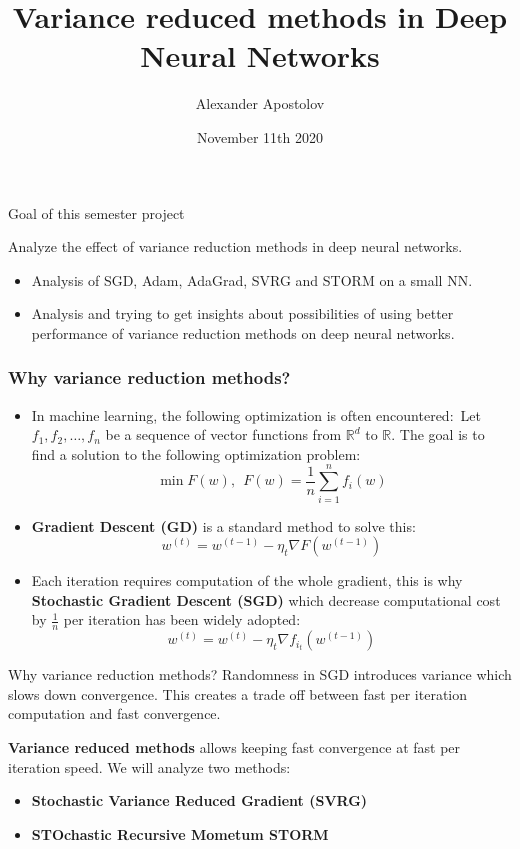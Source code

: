 \documentclass[10pt]{beamer}
\title{Variance reduced methods in Deep Neural Networks}
\author{Alexander Apostolov}
\institute {École Polytechnique Fédérale de Lausanne}
\date{November 11th 2020}
\begin{document}
\frame{\titlepage}


\begin{frame}{Goal of this semester project}

Analyze the effect of \alert{variance reduction methods} in \alert{deep neural networks}.
\newline
\begin{itemize}
    \item Analysis of SGD, Adam, AdaGrad, SVRG and STORM on a small NN.
    \item Analysis and trying to get insights about possibilities of using better performance of variance reduction methods on deep neural networks. 
\end{itemize}
    
\end{frame}

\begin{frame}
\frametitle{Why variance reduction methods?}
\begin{itemize}
    \item In machine learning, the following optimization is often encountered:\
    Let $f_1, f_2, \dots, f_n$ be a sequence of vector functions from $\mathbb{R}^d$ to $\mathbb{R}$.
    The goal is to find a solution to the following optimization problem:
    $$\min F(w),~~F(w)=\frac{1}{n}\sum_{i=1}^n f_i(w)$$
    \item \textbf{Gradient Descent (GD)} is a standard method to solve this:
    $$w^{(t)} = w^{(t-1)} - \eta_t \nabla F(w^{(t-1)})$$
    \item Each iteration requires computation of the whole gradient, this is why \textbf{Stochastic Gradient Descent (SGD)} which decrease computational cost by $\frac{1}{n}$ per iteration has been widely adopted:
    $$w^{(t)} = w^{(t)} -\eta_t \nabla f_{i_t}(w^{(t-1)})$$
\end{itemize}
\end{frame}

\begin{frame}{Why variance reduction methods?}
    Randomness in SGD introduces variance which slows down convergence. This creates a trade off between fast per iteration computation and fast convergence.
    
    \vspace{5mm}
    \textbf{Variance reduced methods} allows keeping fast convergence at fast per iteration speed. We will analyze two methods:
    \begin{itemize}
        \item \textbf{Stochastic Variance Reduced Gradient (SVRG)}
        \item \textbf{STOchastic Recursive Mometum STORM}
    \end{itemize}
    
\end{frame}
\end{document}

